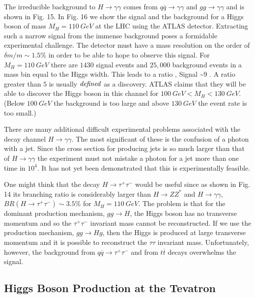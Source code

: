 The irreducible background to $H\rightarrow \gamma\gamma$ comes from $q
\overline{q}\rightarrow \gamma\gamma$ and $gg \rightarrow \gamma
\gamma$ and is shown in Fig. 15.
In Fig. 16 we show the signal and the background for a Higgs boson
of mass $M_H=110~GeV$ at the LHC using the ATLAS detector.  Extracting
such a narrow signal from the immense background poses a formidable
experimental challenge.  The detector must have a mass resolution
on the order of $\delta m/m\sim 1.5 \%$ in order to be able to hope
to observe this signal.
For $M_H=110~GeV$ there are $1430$ signal events and $25,000$ background
events in a mass bin equal to the Higgs width.  This leads to a
ratio ,
\beq
 { {\rm Signal} \over {}}\sim 9
.\eeq
  A ratio greater than
$5$ is usually ${\it defined}$ as a discovery.  ATLAS  claims that
they will be able to discover the Higgs boson in this channel for
$100~GeV < M_H < 130~GeV$.  (Below $100~GeV$ the background is too
large and above $130~GeV$ the event rate is too small.)

There are many additional difficult experimental problems associated with
the decay channel $H\rightarrow \gamma \gamma$.  The most significant
of these is the confusion of a photon with a jet.  Since the cross
section for producing jets is so much larger than that of $H\rightarrow
\gamma\gamma$ the experiment must not mistake a photon for a jet more
than one time in $10^4$.  It has not yet been demonstrated that this
is experimentally feasible.

One might think that the decay $H\rightarrow \tau^+\tau^-$ would be useful
since as shown in Fig. 14
 its branching ratio is considerably larger than $H\rightarrow
Z Z^* $ and $H\rightarrow \gamma \gamma$, $BR(H\rightarrow \tau^+
\tau^-)\sim 3.5\%$ for $M_H=110~GeV$.  The problem is that for the
dominant production mechanism, $gg\rightarrow H$, the Higgs boson
has no transverse momentum and so the $\tau^+\tau^-$ invariant mass
cannot be reconstructed.  If we use the production mechanism,
$g g \rightarrow H g$, then the Higgs is produced at large transverse
momentum and it is  possible to reconstruct the $\tau\tau$ invariant
mass.  Unfortunately, however, the background from
$ q\overline{q}
\rightarrow \tau^+\tau^-$ and from $t \overline{t}$ decays overwhelms
the signal.\cite{keith}

\subsection{Higgs Boson Production at the Tevatron}

